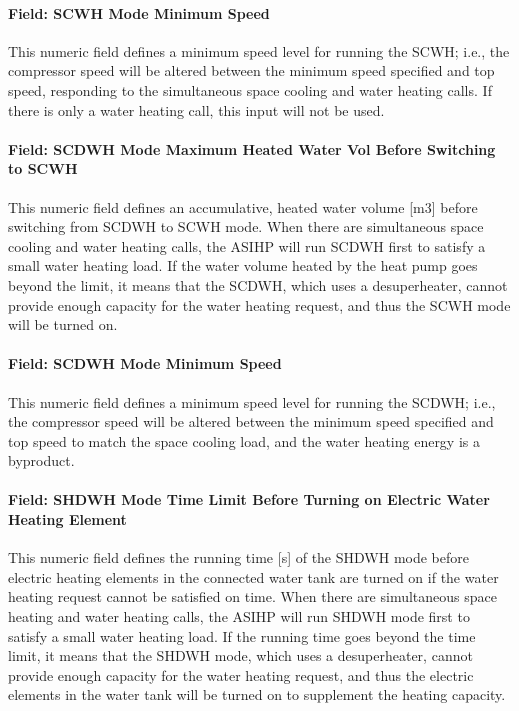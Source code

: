 \paragraph{Field: SCWH Mode Minimum Speed}\label{Field-SCWH-Minimum-Speed-ASIHP}

This numeric field defines a minimum speed level for running the SCWH; i.e., the compressor speed will be altered between the minimum speed specified and top speed, responding to the simultaneous space cooling and water heating calls. If there is only a water heating call, this input will not be used. 

\paragraph{Field: SCDWH Mode Maximum Heated Water Vol Before Switching to SCWH}\label{Field-SCDWH-Max-Water-ASIHP}

This numeric field defines an accumulative, heated water volume [m3] before switching from SCDWH to SCWH mode. When there are simultaneous space cooling and water heating calls, the ASIHP will run SCDWH first to satisfy a small water heating load. If the water volume heated by the heat pump goes beyond the limit, it means that the SCDWH, which uses a desuperheater, cannot provide enough capacity for the water heating request, and thus the SCWH mode will be turned on. 



\paragraph{Field: SCDWH Mode Minimum Speed}\label{Field-SCDWH-MinSped-ASIHP}

This numeric field defines a minimum speed level for running the SCDWH; i.e., the compressor speed will be altered between the minimum speed specified and top speed to match the space cooling load, and the water heating energy is a byproduct. 

\paragraph{Field: SHDWH Mode Time Limit Before Turning on Electric Water Heating Element}\label{Field-SHDWH-HeatElemement-ASIHP}

This numeric field defines the running time [s] of the SHDWH mode before electric heating elements in the connected water tank are turned on if the water heating request cannot be satisfied on time. When there are simultaneous space heating and water heating calls, the ASIHP will run SHDWH mode first to satisfy a small water heating load. If the running time goes beyond the time limit, it means that the SHDWH mode, which uses a desuperheater, cannot provide enough capacity for the water heating request, and thus the electric elements in the water tank will be turned on to supplement the heating capacity.

